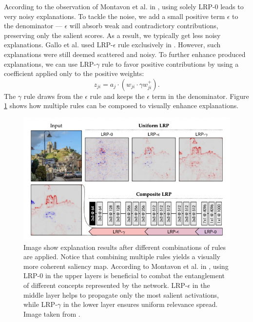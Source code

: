According to the observation of Montavon et al. in \cite{lrp}, using solely LRP-$0$ leads to very noisy explanations.
To tackle the noise, we add a small positive term $\epsilon$ to the denominator --- $\epsilon$ will absorb weak and contradictory contributions, preserving only the salient scores. 
As a result, we typically get less noisy explanations.
Gallo et al. used LRP-$\epsilon$ rule exclusively in \cite{gallo}.
However, such explanations were still deemed scattered and noisy.
To further enhance produced explanations, we can use LRP-$\gamma$ rule to favor positive contributions by using a coefficient applied only to the positive weights:
\begin{equation}
    z_{ji} = {a_j \cdot (w_{ji} \cdot \gamma w_{ji}^+)}.
\end{equation}
The $\gamma$ rule draws from the $\epsilon$ rule and keeps the $\epsilon$ term in the denominator.
Figure \ref{fig:lrp-montavon} shows how multiple rules can be composed to visually enhance explanations.

\begin{figure}[!h]
    \begin{center}
    \begin{minipage}{1\textwidth}
      \includegraphics[width=\textwidth]{img/lrp-montavon.png}
    \end{minipage}
    \caption{Image show explanation results after different combinations of rules are applied. Notice that combining multiple rules yields a visually more coherent saliency map. According to Montavon et al. in \cite{lrp}, using LRP-$0$ in the upper layers is beneficial to combat the entanglement of different concepts represented by the network. LRP-$\epsilon$ in the middle layer helps to propagate only the most salient activations, while LRP-$\gamma$ in the lower layer ensures uniform relevance spread. Image taken from \cite{lrp}.}
    \label{fig:lrp-montavon}
    \end{center}
\end{figure}